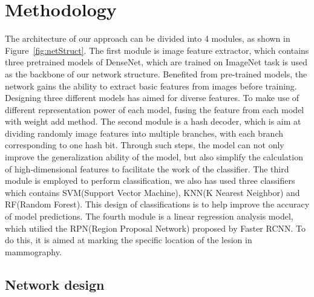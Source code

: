 \section{Methodology}
\label{sec:Meth}

The architecture of our approach can be 
divided into 4 modules, as shown in 
Figure~\ref{fig:netStruct}. 
The first module is image feature extractor, which
contains three pretrained models of DenseNet, which 
are trained on ImageNet task is used as the 
backbone of our network structure. Benefited from 
pre-trained models, the network gains the ability to 
extract basic features from images before training. 
Designing three different models has aimed for 
diverse features. To make use of different 
representation power of each model, fusing the
feature from each model with weight add method.
The second module is a hash decoder, which is aim
at dividing randomly image features into multiple 
branches, with each branch corresponding to one 
hash bit. Through such steps, the model can not 
only improve the generalization ability of the 
model, but also simplify the calculation of 
high-dimensional features to facilitate the work 
of the classifier.
The third module is employed to perform 
classification, we also has 
used three classifiers which contains SVM(Support
Vector Machine), KNN(K Nearest Neighbor) and 
RF(Random Forest). This design of classifications 
is to help improve the accuracy of model 
predictions.
The fourth module is a linear regression analysis 
model, which utilied the RPN(Region Proposal 
Network) proposed by Faster RCNN. To do this, 
it is aimed at marking the specific location of the 
lesion in mammography.

\subsection{Network design}
\label{sec:MethNet}

